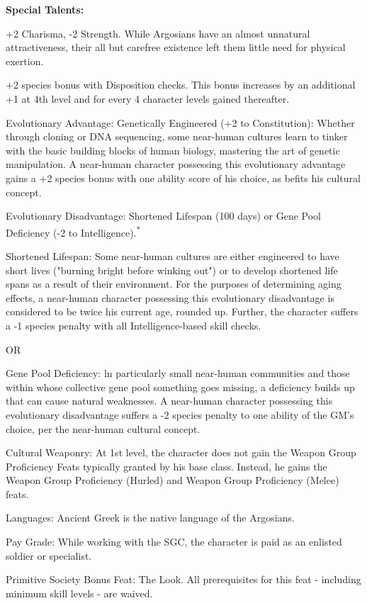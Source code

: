 \textbf{Special Talents:}
\begin{itemize*}
\item +2 Charisma, -2 Strength. While Argosians have an almost unnatural attractiveness, their all but carefree existence left them little need for physical exertion.
\item +2 species bonus with Disposition checks. This bonus increases by an additional +1 at 4th level and for every 4 character levels gained thereafter.
\item Evolutionary Advantage: Genetically Engineered (+2 to Constitution): Whether through cloning or DNA sequencing, some near-human cultures learn to tinker with the basic building blocks of human biology, mastering the art of genetic manipulation. A near-human character possessing this evolutionary advantage gains a +2 species bonus with one ability score of his choice, as befits his cultural concept.
\item Evolutionary Disadvantage: Shortened Lifespan (100 days) or Gene Pool Deficiency (-2 to Intelligence).\textsuperscript{*}

Shortened Lifespan: Some near-human cultures are either engineered to have short lives ("burning bright before winking out") or to develop shortened life spans as a result of their environment. For the purposes of determining aging effects, a near-human character possessing this evolutionary disadvantage is considered to be twice his current age, rounded up. Further, the character suffers a -1 species penalty with all Intelligence-based skill checks.

OR

Gene Pool Deficiency: ln particularly small near-human communities and those within whose collective gene pool something goes missing, a deficiency builds up that can cause natural weaknesses. A near-human character possessing this evolutionary disadvantage suffers a -2 species penalty to one ability of the GM's choice, per the near-human cultural concept.
\item Cultural Weaponry: At 1st level, the character does not gain the Weapon Group Proficiency Feats typically granted by his base class. Instead, he gains the Weapon Group Proficiency (Hurled) and Weapon Group Proficiency (Melee) feats.
\item Languages: Ancient Greek is the native language of the Argosians.
\item Pay Grade: While working with the SGC, the character is paid as an enlisted soldier or specialist.
\item Primitive Society Bonus Feat: The Look. All prerequisites for this feat - including minimum skill levels - are waived.
\end{itemize*}

